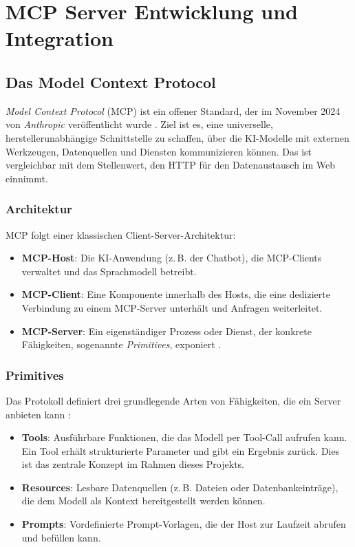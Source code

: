 \chapter{MCP Server Entwicklung und Integration}
\label{chap:mcp}

\section{Das Model Context Protocol}

\emph{Model Context Protocol} (MCP) ist ein offener Standard, der im November 2024 von
\emph{Anthropic} veröffentlicht wurde \cite{mcpspec}. Ziel ist es, eine universelle,
herstellerunabhängige Schnittstelle zu schaffen, über die KI-Modelle mit externen
Werkzeugen, Datenquellen und Diensten kommunizieren können. Das ist vergleichbar mit dem
Stellenwert, den HTTP für den Datenaustausch im Web einnimmt.

\subsection{Architektur}

MCP folgt einer klassischen Client-Server-Architektur:

\begin{itemize}
    \item \textbf{MCP-Host}: Die KI-Anwendung (z.\,B. der Chatbot), die MCP-Clients
    verwaltet und das Sprachmodell betreibt.
    \item \textbf{MCP-Client}: Eine Komponente innerhalb des Hosts, die eine dedizierte
    Verbindung zu einem MCP-Server unterhält und Anfragen weiterleitet.
    \item \textbf{MCP-Server}: Ein eigenständiger Prozess oder Dienst, der konkrete
    Fähigkeiten, sogenannte \emph{Primitives}, exponiert \cite{mcpspec}.
\end{itemize}

\subsection{Primitives}

Das Protokoll definiert drei grundlegende Arten von Fähigkeiten, die ein Server anbieten
kann \cite{mcpspec}:

\begin{itemize}
    \item \textbf{Tools}: Ausführbare Funktionen, die das Modell per Tool-Call aufrufen
    kann. Ein Tool erhält strukturierte Parameter und gibt ein Ergebnis zurück. Dies ist
    das zentrale Konzept im Rahmen dieses Projekts.
    \item \textbf{Resources}: Lesbare Datenquellen (z.\,B. Dateien oder Datenbankeinträge),
    die dem Modell als Kontext bereitgestellt werden können.
    \item \textbf{Prompts}: Vordefinierte Prompt-Vorlagen, die der Host zur Laufzeit
    abrufen und befüllen kann.
\end{itemize}

